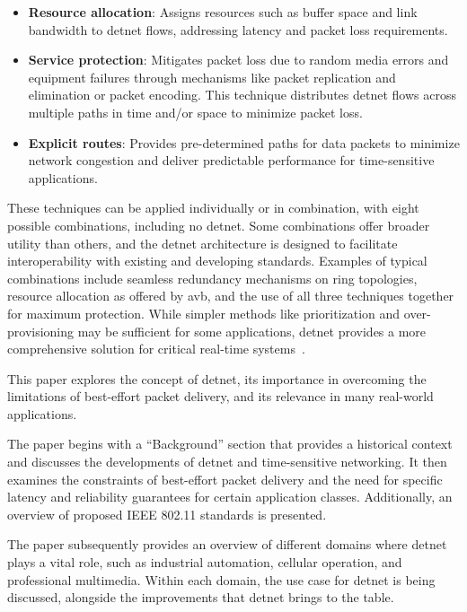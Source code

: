 \documentclass[runningheads]{llncs}
\begin{document}
\begin{itemize}
  \item \textbf{Resource allocation}: Assigns resources such as buffer space and link bandwidth to \gls{detnet} flows, addressing latency and packet loss requirements.
  \item \textbf{Service protection}: Mitigates packet loss due to random media errors and equipment failures through mechanisms like packet replication and elimination or packet encoding. This technique distributes \gls{detnet} flows across multiple paths in time and/or space to minimize packet loss.
  \item \textbf{Explicit routes}: Provides pre-determined paths for data packets to minimize network congestion and deliver predictable performance for time-sensitive applications.
\end{itemize}

These techniques can be applied individually or in combination, with eight possible combinations, including no \gls{detnet}. Some combinations offer broader utility than others, and the \gls{detnet} architecture is designed to facilitate interoperability with existing and developing standards. Examples of typical combinations include seamless redundancy mechanisms on ring topologies, resource allocation as offered by \gls{avb}, and the use of all three techniques together for maximum protection. While simpler methods like prioritization and over-provisioning may be sufficient for some applications, \gls{detnet} provides a more comprehensive solution for critical real-time systems~\cite{rfc8655}.

This paper explores the concept of \gls{detnet}, its importance in overcoming the limitations of best-effort packet delivery, and its relevance in many real-world applications.

The paper begins with a ``Background'' section that provides a historical context and discusses the developments of \gls{detnet} and time-sensitive networking. It then examines the constraints of best-effort packet delivery and the need for specific latency and reliability guarantees for certain application classes. Additionally, an overview of proposed IEEE 802.11 standards is presented.

The paper subsequently provides an overview of different domains where \gls{detnet} plays a vital role, such as industrial automation, cellular operation, and professional multimedia. Within each domain, the use case for \gls{detnet} is being discussed, alongside the improvements that \gls{detnet} brings to the table.
\end{document}
